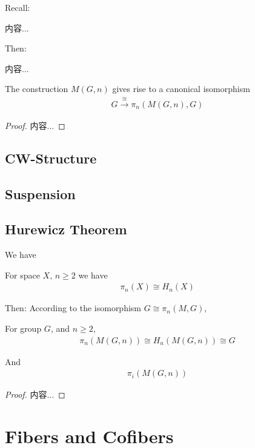 \documentclass[Total.tex]{subfiles}
\begin{document}
			Recall:
			\begin{Def}
				内容...
			\end{Def}
			
			Then:
			\begin{Def}
				内容...
			\end{Def}
			
			\begin{proposition}
				The construction $M(G,n)$ gives rise to a canonical isomorphism
				\begin{gather*}
					G\stackrel{\cong}{\rightarrow } \pi_n(M(G,n),G)
				\end{gather*}
			\end{proposition}
			\begin{proof}
				内容...
			\end{proof}
			
			\subsection{CW-Structure}
			\subsection{Suspension}
			\subsection{Hurewicz Theorem}
			
			We have
			\begin{theorem}
				For space $X$, $n\geq 2$ we have
				\begin{gather*}
					\pi_n(X)\cong H_n(X)
				\end{gather*}
			\end{theorem}
			
			Then: According to the isomorphism $G\cong \pi_n(M,G)$,
			\begin{corollary}
				For group $G$, and $n\geq 2$,
				\begin{gather*}
					\pi_n(M(G,n))\cong H_n(M(G,n))\cong G
				\end{gather*}
				
				And
				\begin{gather*}
					\pi_i(M(G,n))
				\end{gather*}
			\end{corollary}
			\begin{proof}
				内容...
			\end{proof}
		\section{Fibers and Cofibers}
\end{document}
